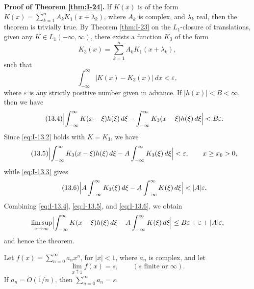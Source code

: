 \noindent\textbf{Proof of Theorem \ref{thm:I-24}.}
If $K(x)$ is of the form $K(x)=\sum_{k=1}^{n}A_kK_1(x+\lambda_k)$, where $A_k$ is complex, and $\lambda_k$ real, then the theorem is trivially true. By Theorem \ref{thm:I-23} on the $L_1$-closure of translations, given any $K\in L_1(-\infty,\infty)$, there exists a function $K_3$ of the form
\begin{equation*}
K_3(x)=\sum_{k=1}^{n}A_kK_1(x+\lambda_k),
\end{equation*}
such that
\begin{equation}\label{eq:I-13.3}\tag{13.3}
\int_{-\infty}^{\infty}|K(x)-K_3(x)|\,dx<\varepsilon,
\end{equation}
where $\varepsilon$ is any strictly positive number given in advance. If $|h(x)|<B<\infty$, then we have
\begin{equation}\label{eq:I-13.4}\tag{13.4}
\Bigl|\int_{-\infty}^{\infty}K(x-\xi)h(\xi)\,d\xi-\int_{-\infty}^{\infty}K_3(x-\xi)h(\xi)\,d\xi\Bigr|<B\varepsilon.
\end{equation}
Since \eqref{eq:I-13.2} holds with $K=K_3$, we have
\begin{equation}\label{eq:I-13.5}\tag{13.5}
\Bigl|\int_{-\infty}^{\infty}K_3(x-\xi)h(\xi)\,d\xi-A\int_{-\infty}^{\infty}K_3(\xi)\,d\xi\Bigr|<\varepsilon,\qquad x\ge x_0>0,
\end{equation}
while \eqref{eq:I-13.3} gives
\begin{equation}\label{eq:I-13.6}\tag{13.6}
\Bigl|A\int_{-\infty}^{\infty}K_3(\xi)\,d\xi-A\int_{-\infty}^{\infty}K(\xi)\,d\xi\Bigr|<|A|\varepsilon.
\end{equation}
Combining \eqref{eq:I-13.4}, \eqref{eq:I-13.5}, and \eqref{eq:I-13.6}, we obtain
\begin{equation*}
\limsup_{x\to\infty}\Bigl|\int_{-\infty}^{\infty}K(x-\xi)h(\xi)\,d\xi-A\int_{-\infty}^{\infty}K(\xi)\,d\xi\Bigr|
\le B\varepsilon+\varepsilon+|A|\varepsilon,
\end{equation*}
and hence the theorem.

\begin{theorem}\label{thm:I-26}
Let $f(x)=\sum_{n=0}^{\infty}a_nx^n$, for $|x|<1$, where $a_n$ is complex, and let
\begin{equation*}
\lim_{x\uparrow 1}f(x)=s,\qquad(s\text{ finite or }\infty).
\end{equation*}
If $a_n=O(1/n)$, then $\sum_{n=0}^{\infty}a_n=s$.
\end{theorem}

